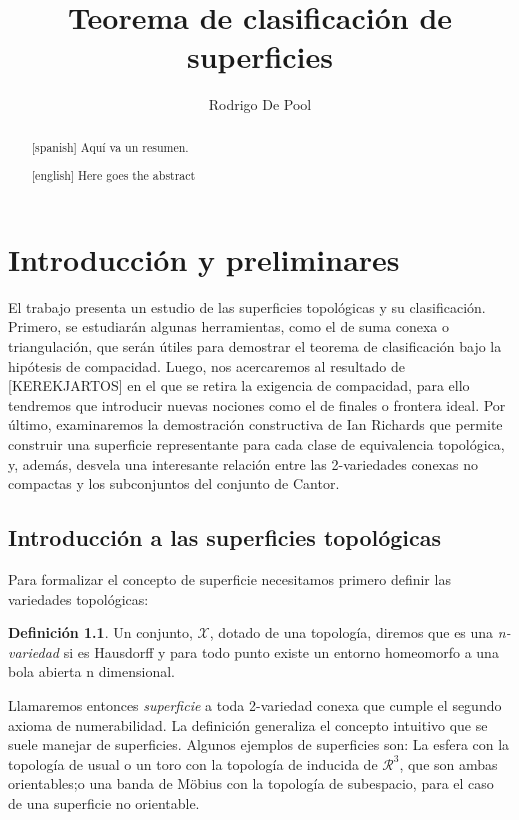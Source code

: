 \documentclass[a4paper,11pt,spanish, twoside, leqno]{tfg-uam}
\title{Teorema de clasificación de superficies}
\author{Rodrigo De Pool}
\theoremstyle{definition}
\newtheorem{defin}[teor]{Definici\'on}
\begin{document}
\begin{abstract}[spanish]
Aquí va un resumen.
\end{abstract}
\begin{abstract}[english]
	Here goes the abstract
\end{abstract}


\mainmatter


\chapter{Introducci\'on y preliminares}\label{chap1}
\setcounter{page}{1}

El trabajo presenta un estudio de las superficies topológicas y su clasificación. Primero, se estudiarán algunas herramientas, como el de suma conexa o triangulación, que serán útiles para demostrar el teorema de clasificación bajo la hipótesis de compacidad. Luego, nos acercaremos al resultado de [KEREKJARTOS] en el que se retira la exigencia de compacidad, para ello tendremos que introducir nuevas nociones como el de finales o frontera ideal. Por último, examinaremos la demostración constructiva de Ian Richards \cite{ian} que permite construir una superficie representante para cada clase de equivalencia topológica, y, además, desvela una interesante relación entre las 2-variedades conexas no compactas y los subconjuntos del conjunto de Cantor.

\section{Introducci\'on a las superficies topológicas}

Para formalizar el concepto de superficie necesitamos primero definir las variedades topológicas:
\begin{defin}
	Un conjunto, $\mathcal{X}$, dotado de una topología, diremos que es una \textit{n-variedad} si es Hausdorff y para todo punto existe un entorno homeomorfo a una bola abierta n dimensional.
\end{defin}

Llamaremos entonces \textit{superficie} a toda 2-variedad conexa que cumple el segundo axioma de numerabilidad. La definición generaliza el concepto intuitivo que se suele manejar de superficies. Algunos ejemplos de superficies son: La esfera con la topología de usual o un toro con la topología de inducida de $\mathcal{R}^3$, que son ambas orientables;o una banda de M\"{o}bius con la topología de subespacio, para el caso de una superficie no orientable.
\end{document}
